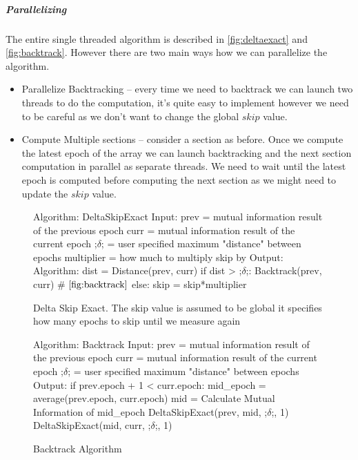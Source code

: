 \documentclass[dissertation.tex]{subfiles}
\begin{document}
  \subparagraph{Parallelizing} 
  The entire single threaded algorithm is described in \autoref{fig:deltaexact}
  and \autoref{fig:backtrack}. However there are two main ways how we can
  parallelize the algorithm.
  \begin{itemize}
    \item{
        Parallelize Backtracking -- every time we need to backtrack we can
        launch two threads to do the computation, it's quite easy to implement
        however we need to be careful as we don't want to change the global
        $skip$ value.
      }
    \item{
        Compute Multiple sections -- consider a section as before.
        Once we compute the latest epoch of the array we can launch backtracking
        and the next section computation in parallel as separate threads.
        We need to wait until the latest epoch is computed before computing the
        next section as we might need to
        update the $skip$ value.
      }
  \end{itemize}

  

\begin{figure}[H]
    \begin{pythonfigure}
      Algorithm: DeltaSkipExact
      Input:
      prev = mutual information result of the previous epoch
      curr = mutual information result of the current epoch
      ;$\delta$; = user specified maximum "distance" between epochs
      multiplier = how much to multiply skip by
      Output:
      Algorithm:
      dist = Distance(prev, curr)
      if dist > ;$\delta$;:
        Backtrack(prev, curr) # $\autoref{fig:backtrack}$
      else:
        skip = skip*multiplier
    \end{pythonfigure}
    \caption{Delta Skip Exact. The skip value is assumed to be global it
    specifies how many epochs to skip until we measure again}
    \label{fig:deltaexact}
\end{figure}

\begin{figure}[H]
    \begin{pythonfigure}
      Algorithm: Backtrack
      Input:
      prev = mutual information result of the previous epoch
      curr = mutual information result of the current epoch
      ;$\delta$; = user specified maximum "distance" between epochs
      Output:
      if prev.epoch + 1 < curr.epoch:
        mid_epoch = average(prev.epoch, curr.epoch)
        mid = Calculate Mutual Information of mid_epoch
        DeltaSkipExact(prev, mid, ;$\delta$;, 1)
        DeltaSkipExact(mid, curr, ;$\delta$;, 1)
    \end{pythonfigure}
    \caption{Backtrack Algorithm}
    \label{fig:backtrack}
\end{figure}
\end{document}
